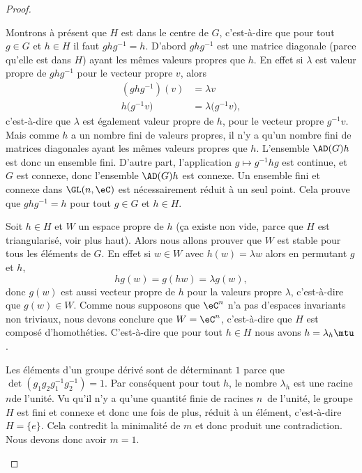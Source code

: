 \begin{proof}
\begin{subproof}

		Montrons à présent que \( H\) est dans le centre de \( G\), c'est-à-dire que pour tout \( g\in G\) et \( h\in H\) il faut \( ghg^{-1}=h\). D'abord \( ghg^{-1}\) est une matrice diagonale (parce qu'elle est dans \( H\)) ayant les mêmes valeurs propres que \( h\). En effet si \( \lambda\) est valeur propre de \( ghg^{-1}\) pour le vecteur propre \( v\), alors
		\begin{subequations}
			\begin{align}
				(ghg^{-1})(v)         & =\lambda v                    \\
				h\big( g^{-1} v \big) & =\lambda \big( g^{-1}v \big),
			\end{align}
		\end{subequations}
		c'est-à-dire que \( \lambda\) est également valeur propre de \( h\), pour le vecteur propre \( g^{-1} v\). Mais comme \( h\) a un nombre fini de valeurs propres, il n'y a qu'un nombre fini de matrices diagonales ayant les mêmes valeurs propres que \( h\). L'ensemble \( \AD(G)h\) est donc un ensemble fini. D'autre part, l'application \( g\mapsto g^{-1}hg\) est continue, et \( G\) est connexe, donc l'ensemble \( \AD(G)h\) est connexe. Un ensemble fini et connexe dans \( \GL(n,\eC)\) est nécessairement réduit à un seul point. Cela prouve que \( ghg^{-1}=h\) pour tout \( g\in G\) et \( h\in H\).


		Soit \( h\in H\) et \( W\) un espace propre de \( h\) (ça existe non vide, parce que \( H\) est triangularisé, voir plus haut). Alors nous allons prouver que \( W\) est stable pour tous les éléments de \( G\). En effet si \( w\in W\) avec \( h(w)=\lambda w\) alors en permutant \( g\) et \( h\),
		\begin{equation}
			hg(w)=g(hw)=\lambda g(w),
		\end{equation}
		donc \( g(w)\) est aussi vecteur propre de \( h\) pour la valeurs propre \( \lambda\), c'est-à-dire que \( g(w)\in W\). Comme nous supposons que \( \eC^n\) n'a pas d'espaces invariants non triviaux, nous devons conclure que \( W=\eC^n\), c'est-à-dire que \( H\) est composé d'homothéties. C'est-à-dire que pour tout \( h\in H\) nous avons \( h=\lambda_h\mtu\).


		Les éléments d'un groupe dérivé sont de déterminant \( 1\) parce que \( \det(g_1g_2g_1^{-1}g_2^{-1})=1\). Par conséquent pour tout \( h\), le nombre \( \lambda_h\) est une racine \( n\)\ieme de l'unité. Vu qu'il n'y a qu'une quantité finie de racines \( n\)\ieme\ de l'unité, le groupe \( H\) est fini et connexe et donc une fois de plus, réduit à un élément, c'est-à-dire \( H=\{ e \}\). Cela contredit la minimalité de \( m\) et donc produit une contradiction. Nous devons donc avoir \( m=1\).


\end{subproof}
\end{proof}
